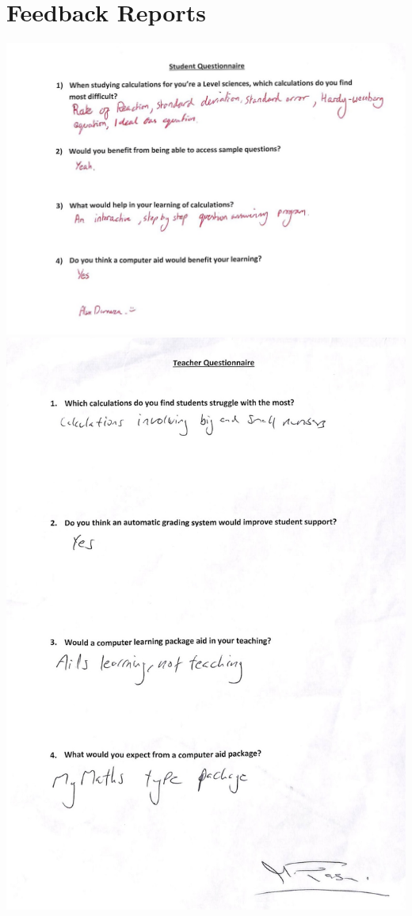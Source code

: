 \documentclass[a4paper,12pt]{book}
\begin{document}
\section{Feedback Reports}
\includegraphics{StudentQuestionnaire}
\includegraphics{TeacherQuestionnaire}
\end{document}
